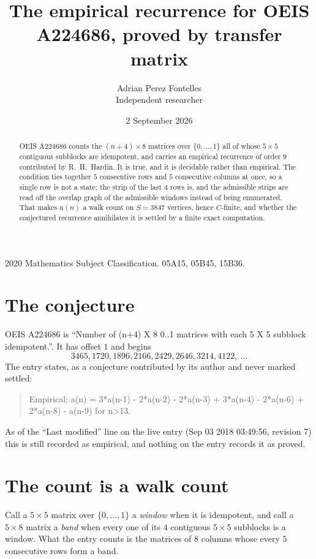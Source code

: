 \documentclass[11pt,a4paper]{article}
\title{The empirical recurrence for OEIS A224686, proved by transfer matrix}
\author{Adrian Perez Fontelles\\ \small Independent researcher}
\date{2 September 2026}
\theoremstyle{plain}
\theoremstyle{definition}
\begin{document}
\maketitle

\begin{abstract}
OEIS A224686 counts the $(n+4)\times8$ matrices over $\{0,\dots,1\}$ all of whose
$5\times5$ contiguous subblocks are idempotent, and carries an empirical recurrence of order
$9$ contributed by R.~H.~Hardin. It is true, and it is decidable rather than empirical.
The condition ties together $5$ consecutive rows and $5$ consecutive columns at once, so a
single row is not a state; the strip of the last $4$ rows is, and the admissible strips
are read off the overlap graph of the admissible windows instead of being enumerated. That
makes $a(n)$ a walk count on $S=3847$ vertices, hence $C$-finite, and whether the conjectured
recurrence annihilates it is settled by a finite exact computation.
\end{abstract}

\noindent\small 2020 Mathematics Subject Classification. 05A15, 05B45, 15B36.\normalsize

\section{The conjecture}

OEIS A224686 is ``Number of (n+4) X 8 0..1 matrices with each 5 X 5 subblock idempotent.''. It has offset $1$ and begins
\[
3465, 1720, 1896, 2166, 2429, 2646, 3214, 4122,\ \dots
\]
The entry states, as a conjecture contributed by its author and never marked settled:
\begin{quote}
Empirical: a(n) = 3*a(n-1) - 2*a(n-2) - 2*a(n-3) + 3*a(n-4) - 2*a(n-6) + 2*a(n-8) - a(n-9) for n>13.
\end{quote}
As of the ``Last modified'' line on the live entry (Sep 03 2018 03:49:56, revision 7) this is still
recorded as empirical, and nothing on the entry records it as proved.

\section{The count is a walk count}

Call a $5\times5$ matrix over $\{0,\dots,1\}$ a \emph{window} when it is idempotent, and
call a $5\times8$ matrix a \emph{band} when every one of its $4$ contiguous
$5\times5$ subblocks is a window. What the entry counts is the matrices of $8$ columns
whose every $5$ consecutive rows form a band.
\end{document}
